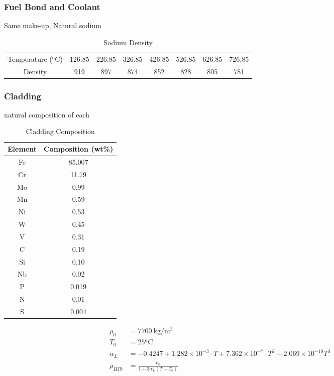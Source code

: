 \documentclass[11pt]{article}
\newcommand{\cel}{$^o$C}
\begin{document}
\subsubsection{Fuel Bond and Coolant}

Same make-up, Natural sodium

\begin{table}[htbp]
    \centering
    \caption{Sodium Density}
    \begin{tabular}{cccccccc}
        \bottomrule
        Temperature (\cel) & 126.85 & 226.85 & 326.85 & 426.85 & 526.85 & 626.85 & 726.85 \\
        Density & 919 & 897 & 874 & 852 & 828 & 805 & 781\\
        \toprule
    \end{tabular}
\end{table}

\subsubsection{Cladding}

natural composition of each

\begin{table}[htbp]
    \centering
    \caption{Cladding Composition}
    \begin{tabular}{cc}
        Element & Composition (wt\%)\\
        \toprule
        \bottomrule
        Fe & 85.007 \\
        Cr & 11.79 \\
        Mo & 0.99 \\
        Mn & 0.59 \\
        Ni & 0.53 \\
        W & 0.45 \\
        V & 0.31 \\
        C & 0.19 \\
        Si & 0.10 \\
        Nb & 0.02 \\
        P & 0.019 \\
        N & 0.01 \\
        S & 0.004 \\
        \toprule
    \end{tabular}
\end{table}

\begin{align}
    \rho_0 &= 7700\ \text{kg/m$^3$}\\
    T_0 &= 25 \text{\cel}\\
    \alpha_L &= -0.4247 + 1.282\times10^{-3}\cdot T + 7.362\times10^{-7}\cdot T^2 - 2.069\times10^{-10}T^3\\
    \rho_{HT9} &= \frac{\rho_0}{1 + 3\alpha_L (T - T_0)}
\end{align}
\end{document}
